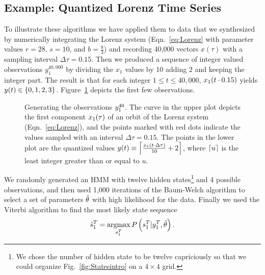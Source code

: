 \subsection{Example: Quantized Lorenz Time Series}
\label{sec:QuantizedLorenz}


To illustrate these algorithms we have applied them to data that we
synthesized by numerically integrating the Lorenz system
(Eqn.~\eqref{eq:Lorenz} with parameter values $r=28$, $s=10$, and
$b=\frac{8}{3}$) and recording 40,000 vectors $x(\tau)$ with a
sampling interval $\Delta \tau = 0.15$.  Then we produced a sequence
of integer valued observations $y_1^{40,000}$ by dividing the $x_1$
values by 10 adding 2 and keeping the integer part.  The result is
that for each integer $1\leq t \leq 40,000$, ${x_1}{(t\cdot0.15)}$
yields ${y}{(t)} \in \left\{0,1,2,3\right\}$.
Figure~\ref{fig:TSintro} depicts the first few observations.

\begin{figure}[htbp]
  \caption[Generating the observations
  $\ts{y}{1}{40}$.]%
  {Generating the observations $\ts{y}{1}{40}$.  The curve in the
    upper plot depicts the first component ${x_1}{(\tau)}$ of an
    orbit of the Lorenz system (Eqn.~\ref{eq:Lorenz}), and the points
    marked with red dots indicate the values sampled with an interval
    $\Delta \tau = 0.15$.  The points in the lower plot are the
    quantized values
    ${y}{(t)} \equiv \left\lceil\frac{{x_1}{(t \cdot \Delta \tau)}}{10}
      + 2\right\rceil$, where $\lceil u\rceil$ is the least integer greater than or
    equal to $u$.  }
  \label{fig:TSintro} 
\end{figure}
 
We randomly generated an HMM with twelve hidden states\footnote{We
  chose the number of hidden state to be twelve capriciously so that
  we could organize Fig.~\ref{fig:Statesintro} on a $4\times 4$ grid.}
and 4 possible observations, and then used 1,000 iterations of the
Baum-Welch algorithm to select a set of parameters $\hat {\theta}$
with high likelihood for the data.  Finally we used the Viterbi
algorithm to find the most likely state sequence
 \begin{equation*}
   {\hat s_{1}^{T}} = \operatorname*{argmax}_{s_{1}^{T}}P
   \left(s_{1}^{T}|y_{1}^{T}, \hat {\theta} \right).
 \end{equation*}
 
